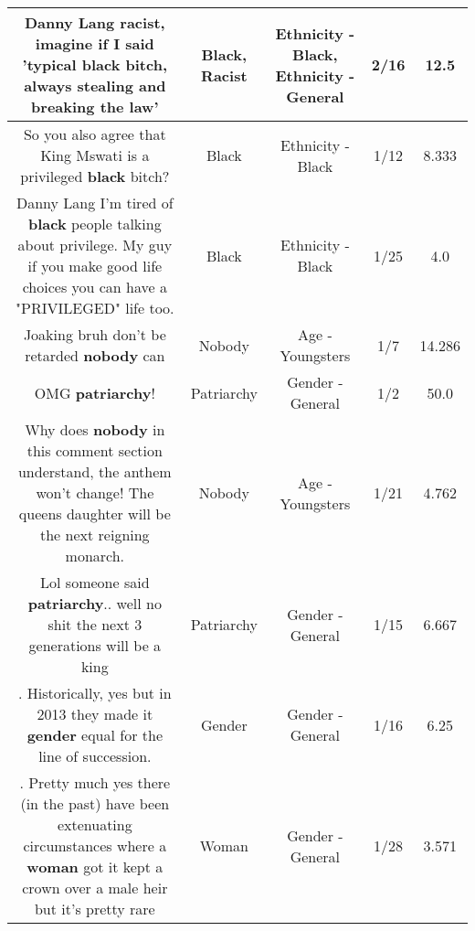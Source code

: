 \documentclass[11pt]{article}
\newlength\mylength
\begin{document}
\begin{center}
\begin{longtable}{|C{.65\mylength}|C{.30\mylength}|C{.12\mylength}|C{.12\mylength}|C{.12\mylength}|}
  \small Danny Lang \textbf{racist}, imagine if I said 'typical \textbf{black} bitch, always stealing and breaking the law'\normalsize   & Black, Racist & Ethnicity - Black, Ethnicity - General & 2/16 & 12.5 \\  \hline
  \small So you also agree that King Mswati is a privileged \textbf{black} bitch?\normalsize   & Black & Ethnicity - Black & 1/12 & 8.333 \\  \hline
  \small Danny Lang I'm tired of \textbf{black} people talking about privilege. My guy if you make good life choices you can have a "PRIVILEGED" life too.\normalsize   & Black & Ethnicity - Black & 1/25 & 4.0 \\  \hline
  \small Joaking bruh don't be retarded \textbf{nobody} can\normalsize   & Nobody & Age - Youngsters & 1/7 & 14.286 \\  \hline
  \small OMG \textbf{patriarchy}!\normalsize   & Patriarchy & Gender - General & 1/2 & 50.0 \\  \hline
  \small Why does \textbf{nobody} in this comment section understand, the anthem won't change! The queens daughter will be the next reigning monarch.\normalsize   & Nobody & Age - Youngsters & 1/21 & 4.762 \\  \hline
  \small Lol someone said \textbf{patriarchy}.. well no shit the next 3 generations will be a king\normalsize   & Patriarchy & Gender - General & 1/15 & 6.667 \\  \hline
  \small . Historically, yes but in 2013 they made it \textbf{gender} equal for the line of succession.\normalsize   & Gender & Gender - General & 1/16 & 6.25 \\  \hline
  \small . Pretty much yes there (in the past) have been extenuating circumstances where a \textbf{woman} got it kept a crown over a male heir but it's pretty rare\normalsize   & Woman & Gender - General & 1/28 & 3.571 \\  \hline

\end{longtable}
\end{center}
\end{document}
